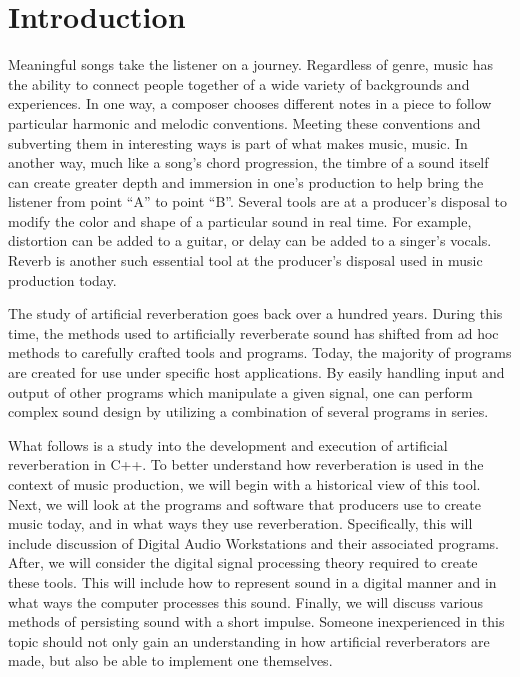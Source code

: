 \chapter{Introduction}\label{intro}
\hspace*{-0.132cm}Meaningful songs take the listener on a journey. Regardless of genre, music has the ability to connect people together of a wide variety of backgrounds and experiences. In one way, a composer chooses different notes in a piece to follow particular harmonic and melodic conventions. Meeting these conventions and subverting them in interesting ways is part of what makes music, music. In another way, much like a song's chord progression, the timbre of a sound itself can create greater depth and immersion in one's production to help bring the listener from point ``A'' to point ``B''. Several tools are at a producer's disposal to modify the color and shape of a particular sound in real time. For example, distortion can be added to a guitar, or delay can be added to a singer's vocals. Reverb is another such essential tool at the producer's disposal used in music production today.

The study of artificial reverberation goes back over a hundred years. During this time, the methods used to artificially reverberate sound has shifted from ad hoc methods to carefully crafted tools and programs. Today, the majority of programs are created for use under specific host applications. By easily handling input and output of other programs which manipulate a given signal, one can perform complex sound design by utilizing a combination of several programs in series.

What follows is a study into the development and execution of artificial reverberation in C++. To better understand how reverberation is used in the context of music production, we will begin with a historical view of this tool. Next, we will look at the programs and software that producers use to create music today, and in what ways they use reverberation. Specifically, this will include discussion of Digital Audio Workstations and their associated programs. After, we will consider the digital signal processing theory required to create these tools. This will include how to represent sound in a digital manner and in what ways the computer processes this sound. Finally, we will discuss various methods of persisting sound with a short impulse. Someone inexperienced in this topic should not only gain an understanding in how artificial reverberators are made, but also be able to implement one themselves.
